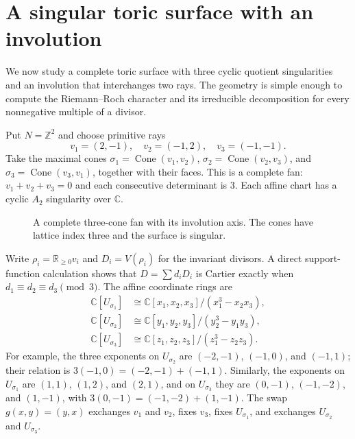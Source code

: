 \documentclass[12pt,letterpaper]{article}
\theoremstyle{definition}
\theoremstyle{remark}
\numberwithin{equation}{section}
\newcommand{\CC}{\mathbb C}
\newcommand{\ZZ}{\mathbb Z}
\newcommand{\RR}{\mathbb R}
\begin{document}
\section{A singular toric surface with an involution}\label{sec:surface}
We now study a complete toric surface with three cyclic quotient singularities and an involution that interchanges two rays. The geometry is simple enough to compute the Riemann--Roch character and its irreducible decomposition for every nonnegative multiple of a divisor.

Put $N=\ZZ^2$ and choose primitive rays
\begin{equation}\label{eq:rays}
v_1=(2,-1),\quad v_2=(-1,2),\quad v_3=(-1,-1).
\end{equation}
Take the maximal cones $\sigma_1=\operatorname{Cone}(v_1,v_2)$,
$\sigma_2=\operatorname{Cone}(v_2,v_3)$, and
$\sigma_3=\operatorname{Cone}(v_3,v_1)$, together with their faces. This is a complete fan: $v_1+v_2+v_3=0$ and each consecutive determinant is $3$. Each affine chart has a cyclic $A_2$ singularity over $\CC$.

\begin{figure}[ht]
\centering
{}
\caption{A complete three-cone fan with its involution axis. The cones have lattice index three and the surface is singular.}\label{fig:fan}
\end{figure}

Write $\rho_i=\RR_{\geq0}v_i$ and $D_i=V(\rho_i)$ for the invariant divisors. A direct support-function calculation shows that $D=\sum d_iD_i$ is Cartier exactly when $d_1\equiv d_2\equiv d_3\pmod3$. The affine coordinate rings are
\begin{equation}\label{eq:charts}
\begin{aligned}
\CC[U_{\sigma_1}]&\cong\CC[x_1,x_2,x_3]/(x_1^3-x_2x_3),\\
\CC[U_{\sigma_2}]&\cong\CC[y_1,y_2,y_3]/(y_2^3-y_1y_3),\\
\CC[U_{\sigma_3}]&\cong\CC[z_1,z_2,z_3]/(z_1^3-z_2z_3).
\end{aligned}
\end{equation}
For example, the three exponents on $U_{\sigma_2}$ are $(-2,-1)$, $(-1,0)$, and $(-1,1)$; their relation is $3(-1,0)=(-2,-1)+(-1,1)$. Similarly, the exponents on $U_{\sigma_1}$ are $(1,1)$, $(1,2)$, and $(2,1)$, and on $U_{\sigma_3}$ they are $(0,-1)$, $(-1,-2)$, and $(1,-1)$, with $3(0,-1)=(-1,-2)+(1,-1)$. The swap $g(x,y)=(y,x)$ exchanges $v_1$ and $v_2$, fixes $v_3$, fixes $U_{\sigma_1}$, and exchanges $U_{\sigma_2}$ and $U_{\sigma_3}$.
\end{document}
